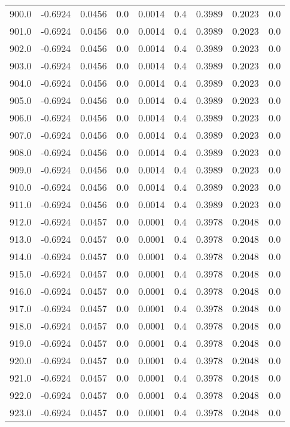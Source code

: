\begin{longtable}{lrrrrrrrr}
900.0 & -0.6924 & 0.0456 & 0.0 & 0.0014 & 0.4 & 0.3989 & 0.2023 & 0.0 \\
901.0 & -0.6924 & 0.0456 & 0.0 & 0.0014 & 0.4 & 0.3989 & 0.2023 & 0.0 \\
902.0 & -0.6924 & 0.0456 & 0.0 & 0.0014 & 0.4 & 0.3989 & 0.2023 & 0.0 \\
903.0 & -0.6924 & 0.0456 & 0.0 & 0.0014 & 0.4 & 0.3989 & 0.2023 & 0.0 \\
904.0 & -0.6924 & 0.0456 & 0.0 & 0.0014 & 0.4 & 0.3989 & 0.2023 & 0.0 \\
905.0 & -0.6924 & 0.0456 & 0.0 & 0.0014 & 0.4 & 0.3989 & 0.2023 & 0.0 \\
906.0 & -0.6924 & 0.0456 & 0.0 & 0.0014 & 0.4 & 0.3989 & 0.2023 & 0.0 \\
907.0 & -0.6924 & 0.0456 & 0.0 & 0.0014 & 0.4 & 0.3989 & 0.2023 & 0.0 \\
908.0 & -0.6924 & 0.0456 & 0.0 & 0.0014 & 0.4 & 0.3989 & 0.2023 & 0.0 \\
909.0 & -0.6924 & 0.0456 & 0.0 & 0.0014 & 0.4 & 0.3989 & 0.2023 & 0.0 \\
910.0 & -0.6924 & 0.0456 & 0.0 & 0.0014 & 0.4 & 0.3989 & 0.2023 & 0.0 \\
911.0 & -0.6924 & 0.0456 & 0.0 & 0.0014 & 0.4 & 0.3989 & 0.2023 & 0.0 \\
912.0 & -0.6924 & 0.0457 & 0.0 & 0.0001 & 0.4 & 0.3978 & 0.2048 & 0.0 \\
913.0 & -0.6924 & 0.0457 & 0.0 & 0.0001 & 0.4 & 0.3978 & 0.2048 & 0.0 \\
914.0 & -0.6924 & 0.0457 & 0.0 & 0.0001 & 0.4 & 0.3978 & 0.2048 & 0.0 \\
915.0 & -0.6924 & 0.0457 & 0.0 & 0.0001 & 0.4 & 0.3978 & 0.2048 & 0.0 \\
916.0 & -0.6924 & 0.0457 & 0.0 & 0.0001 & 0.4 & 0.3978 & 0.2048 & 0.0 \\
917.0 & -0.6924 & 0.0457 & 0.0 & 0.0001 & 0.4 & 0.3978 & 0.2048 & 0.0 \\
918.0 & -0.6924 & 0.0457 & 0.0 & 0.0001 & 0.4 & 0.3978 & 0.2048 & 0.0 \\
919.0 & -0.6924 & 0.0457 & 0.0 & 0.0001 & 0.4 & 0.3978 & 0.2048 & 0.0 \\
920.0 & -0.6924 & 0.0457 & 0.0 & 0.0001 & 0.4 & 0.3978 & 0.2048 & 0.0 \\
921.0 & -0.6924 & 0.0457 & 0.0 & 0.0001 & 0.4 & 0.3978 & 0.2048 & 0.0 \\
922.0 & -0.6924 & 0.0457 & 0.0 & 0.0001 & 0.4 & 0.3978 & 0.2048 & 0.0 \\
923.0 & -0.6924 & 0.0457 & 0.0 & 0.0001 & 0.4 & 0.3978 & 0.2048 & 0.0 \\

\end{longtable}
